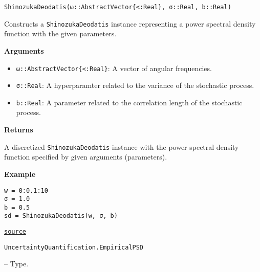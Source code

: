 \begin{adjustwidth}{2em}{0pt}


\begin{verbatim}
ShinozukaDeodatis(ω::AbstractVector{<:Real}, σ::Real, b::Real)
\end{verbatim}

Constructs a \texttt{ShinozukaDeodatis} instance representing a power spectral density function with the given parameters.

\textbf{Arguments}

\begin{itemize}
\item \texttt{ω::AbstractVector\{<:Real\}}: A vector of angular frequencies.


\item \texttt{σ::Real}: A hyperparamter related to the variance of the stochastic process.


\item \texttt{b::Real}: A parameter related to the correlation length of the stochastic process.

\end{itemize}
\textbf{Returns}

A discretized \texttt{ShinozukaDeodatis} instance with the power spectral density function specified by given arguments (parameters).

\textbf{Example}


\begin{verbatim}
w = 0:0.1:10
σ = 1.0
b = 0.5
sd = ShinozukaDeodatis(w, σ, b)
\end{verbatim}



\href{https://github.com/friesischscott/UncertaintyQuantification.jl/blob/f5ee6cce729f0d6a57979257379c942cdf42f86f/src/dynamics/psd.jl#L109-L129}{\texttt{source}}


\end{adjustwidth}
\hypertarget{11283129380918957935}{\texttt{UncertaintyQuantification.EmpiricalPSD}}  -- {Type.}

